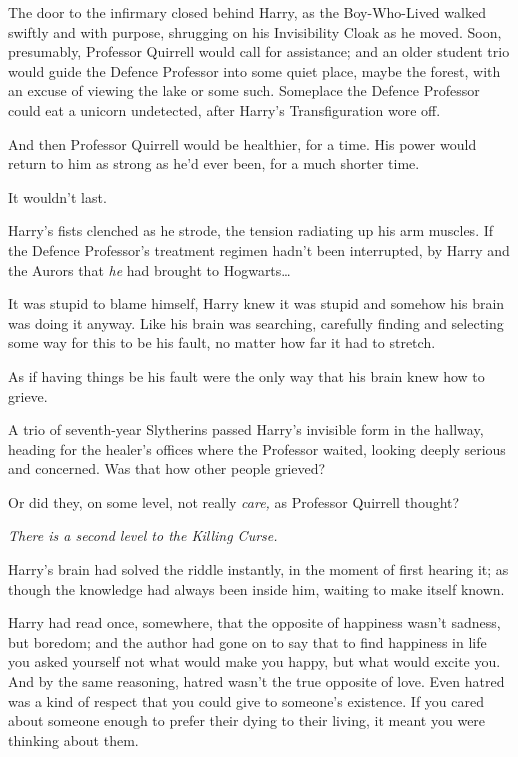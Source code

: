 \later

The door to the infirmary closed behind Harry, as the Boy-Who-Lived walked swiftly and with purpose, shrugging on his Invisibility Cloak as he moved. Soon, presumably, Professor Quirrell would call for assistance; and an older student trio would guide the Defence Professor into some quiet place, maybe the forest, with an excuse of viewing the lake or some such. Someplace the Defence Professor could eat a unicorn undetected, after Harry’s Transfiguration wore off.

And then Professor Quirrell would be healthier, for a time. His power would return to him as strong as he’d ever been, for a much shorter time.

It wouldn’t last.

Harry’s fists clenched as he strode, the tension radiating up his arm muscles. If the Defence Professor’s treatment regimen hadn’t been interrupted, by Harry and the Aurors that \emph{he} had brought to Hogwarts…

It was stupid to blame himself, Harry knew it was stupid and somehow his brain was doing it anyway. Like his brain was searching, carefully finding and selecting some way for this to be his fault, no matter how far it had to stretch.

As if having things be his fault were the only way that his brain knew how to grieve.

A trio of seventh-year Slytherins passed Harry’s invisible form in the hallway, heading for the healer’s offices where the Professor waited, looking deeply serious and concerned. Was that how other people grieved?

Or did they, on some level, not really \emph{care,} as Professor Quirrell thought?

\emph{There is a second level to the Killing Curse.}

Harry’s brain had solved the riddle instantly, in the moment of first hearing it; as though the knowledge had always been inside him, waiting to make itself known.

Harry had read once, somewhere, that the opposite of happiness wasn’t sadness, but boredom; and the author had gone on to say that to find happiness in life you asked yourself not what would make you happy, but what would excite you. And by the same reasoning, hatred wasn’t the true opposite of love. Even hatred was a kind of respect that you could give to someone’s existence. If you cared about someone enough to prefer their dying to their living, it meant you were thinking about them.

